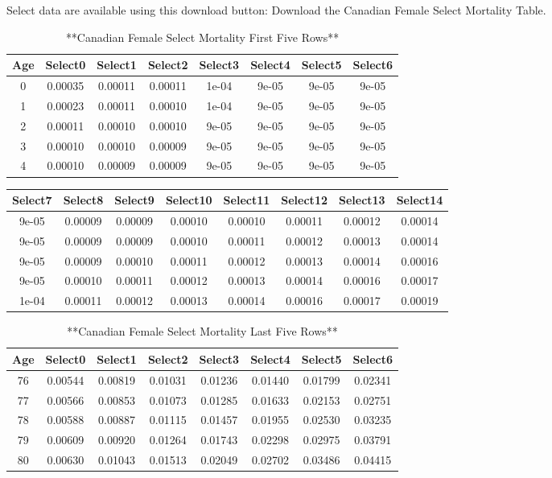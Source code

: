 \documentclass[
]{book}
\begin{document}
Select data are available using this download button:
Download the Canadian Female Select Mortality Table.

\begin{table}

\caption{\label{tab:unnamed-chunk-21}**Canadian Female Select Mortality First Five Rows**}
\centering
\begin{tabular}[t]{c|c|c|c|c|c|c|c}
\hline
Age & Select0 & Select1 & Select2 & Select3 & Select4 & Select5 & Select6\\
\hline
0 & 0.00035 & 0.00011 & 0.00011 & 1e-04 & 9e-05 & 9e-05 & 9e-05\\
\hline
1 & 0.00023 & 0.00011 & 0.00010 & 1e-04 & 9e-05 & 9e-05 & 9e-05\\
\hline
2 & 0.00011 & 0.00010 & 0.00010 & 9e-05 & 9e-05 & 9e-05 & 9e-05\\
\hline
3 & 0.00010 & 0.00010 & 0.00009 & 9e-05 & 9e-05 & 9e-05 & 9e-05\\
\hline
4 & 0.00010 & 0.00009 & 0.00009 & 9e-05 & 9e-05 & 9e-05 & 9e-05\\
\hline
\end{tabular}
\end{table}

\begin{tabular}{c|c|c|c|c|c|c|c}
\hline
Select7 & Select8 & Select9 & Select10 & Select11 & Select12 & Select13 & Select14\\
\hline
9e-05 & 0.00009 & 0.00009 & 0.00010 & 0.00010 & 0.00011 & 0.00012 & 0.00014\\
\hline
9e-05 & 0.00009 & 0.00009 & 0.00010 & 0.00011 & 0.00012 & 0.00013 & 0.00014\\
\hline
9e-05 & 0.00009 & 0.00010 & 0.00011 & 0.00012 & 0.00013 & 0.00014 & 0.00016\\
\hline
9e-05 & 0.00010 & 0.00011 & 0.00012 & 0.00013 & 0.00014 & 0.00016 & 0.00017\\
\hline
1e-04 & 0.00011 & 0.00012 & 0.00013 & 0.00014 & 0.00016 & 0.00017 & 0.00019\\
\hline
\end{tabular}

\begin{table}

\caption{\label{tab:unnamed-chunk-21}**Canadian Female Select Mortality Last Five Rows**}
\centering
\begin{tabular}[t]{c|c|c|c|c|c|c|c}
\hline
Age & Select0 & Select1 & Select2 & Select3 & Select4 & Select5 & Select6\\
\hline
76 & 0.00544 & 0.00819 & 0.01031 & 0.01236 & 0.01440 & 0.01799 & 0.02341\\
\hline
77 & 0.00566 & 0.00853 & 0.01073 & 0.01285 & 0.01633 & 0.02153 & 0.02751\\
\hline
78 & 0.00588 & 0.00887 & 0.01115 & 0.01457 & 0.01955 & 0.02530 & 0.03235\\
\hline
79 & 0.00609 & 0.00920 & 0.01264 & 0.01743 & 0.02298 & 0.02975 & 0.03791\\
\hline
80 & 0.00630 & 0.01043 & 0.01513 & 0.02049 & 0.02702 & 0.03486 & 0.04415\\
\hline
\end{tabular}
\end{table}
\end{document}
